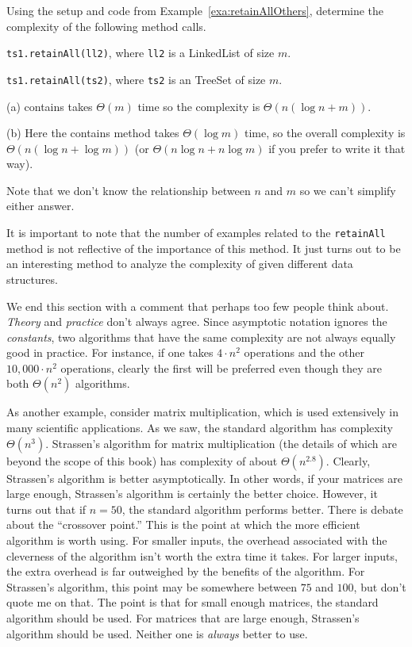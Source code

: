 \begin{exer}
Using the setup and code from Example~\ref{exa:retainAllOthers}, 
determine the complexity of the following method calls.
\begin{lenum}
\item
\verb+ts1.retainAll(ll2)+, where \verb+ll2+ is a LinkedList of size $m$.
\answerlinethree
\item
\verb+ts1.retainAll(ts2)+, where \verb+ts2+ is an TreeSet of size $m$.
\answerlinethree
\end{lenum}
\begin{answer}
(a) contains takes $\Theta(m)$ time so the complexity is
$\Theta(n(\log n+m))$.

(b) Here the contains method takes $\Theta(\log m)$ time, so the overall
complexity is $\Theta(n(\log n+\log m))$ 
(or $\Theta(n\log n + n\log m)$
if you prefer to write it that way).

Note that we don't know the relationship between
$n$ and $m$ so we can't simplify either answer.
\end{answer}
\end{exer}

It is important to note that the number of examples related to the \verb+retainAll+ method
is not reflective of the importance of this method.  It just turns out to be an 
interesting method to analyze the complexity of given different data structures.


We end this section with a comment that perhaps too few people think about.
{\em Theory} and {\em practice} don't always agree. 
Since asymptotic notation ignores the {\em constants}, two algorithms that have the same
complexity are not always equally good in practice.  
For instance, if one takes $4\cdot n^2$ operations
and the other $10,000\cdot n^2$ operations, clearly the first will be preferred even though
they are both $\Theta(n^2)$ algorithms.

As another example, consider matrix multiplication, which is used extensively in
many scientific applications.
As we saw, the standard algorithm has complexity $\Theta(n^3)$.  Strassen's 
algorithm for matrix multiplication (the details of which are beyond the scope of this book)
has complexity of about $\Theta(n^{2.8})$.
Clearly, Strassen's algorithm is better asymptotically.  In other words, if your matrices
are large enough, Strassen's algorithm is certainly the better choice.  However, it turns
out that if $n=50$, the standard algorithm performs better.
There is debate about the ``crossover point.''  This is the point at which the more efficient 
algorithm is worth using.  For smaller inputs, the overhead associated with the cleverness
of the algorithm isn't worth the extra time it takes.  For larger inputs, the extra overhead
is far outweighed by the benefits of the algorithm.  For Strassen's algorithm, this point
may be somewhere between $75$ and $100$, but don't quote me on that.
The point is that for small enough matrices, the standard algorithm should be used.
For matrices that are large enough, Strassen's algorithm should be used.
Neither one is {\em always} better to use.

